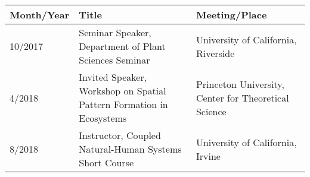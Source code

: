 
\begin{longtable}{lp{10.0cm}p{4.5cm}}
Month/Year & Title & Meeting/Place\\
\hline 
\endhead 
10/2017 & Seminar Speaker, Department of Plant Sciences Seminar & University of California, Riverside \\
4/2018 & Invited Speaker, Workshop on Spatial Pattern Formation in Ecosystems & Princeton University, Center for Theoretical Science \\
8/2018 & Instructor, Coupled Natural-Human Systems Short Course & University of California, Irvine \\
\end{longtable}

